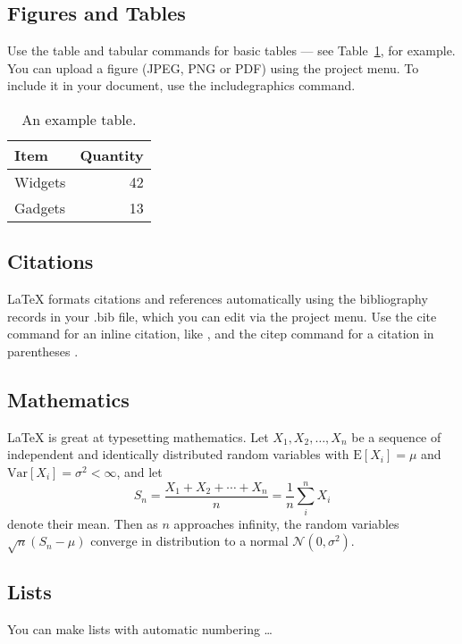 \documentclass[fleqn,10pt]{wlpeerj}
\begin{document}
\subsection*{Figures and Tables}

Use the table and tabular commands for basic tables --- see Table~\ref{tab:widgets}, for example. You can upload a figure (JPEG, PNG or PDF) using the project menu. To include it in your document, use the includegraphics command.

\begin{table}[ht]
	\centering
	\begin{tabular}{l|r}
		Item & Quantity \\\hline
		Widgets & 42 \\
		Gadgets & 13
	\end{tabular}
	\caption{\label{tab:widgets}An example table.}
\end{table}

\subsection*{Citations}

LaTeX formats citations and references automatically using the bibliography records in your .bib file, which you can edit via the project menu. Use the cite command for an inline citation, like \cite{Figueredo:2009dg}, and the citep command for a citation in parentheses \citep{Figueredo:2009dg}.

\subsection*{Mathematics}

\LaTeX{} is great at typesetting mathematics. Let $X_1, X_2, \ldots, X_n$ be a sequence of independent and identically distributed random variables with $\text{E}[X_i] = \mu$ and $\text{Var}[X_i] = \sigma^2 < \infty$, and let
$$S_n = \frac{X_1 + X_2 + \cdots + X_n}{n}
= \frac{1}{n}\sum_{i}^{n} X_i$$
denote their mean. Then as $n$ approaches infinity, the random variables $\sqrt{n}(S_n - \mu)$ converge in distribution to a normal $\mathcal{N}(0, \sigma^2)$.

\subsection*{Lists}

You can make lists with automatic numbering \dots
\end{document}
